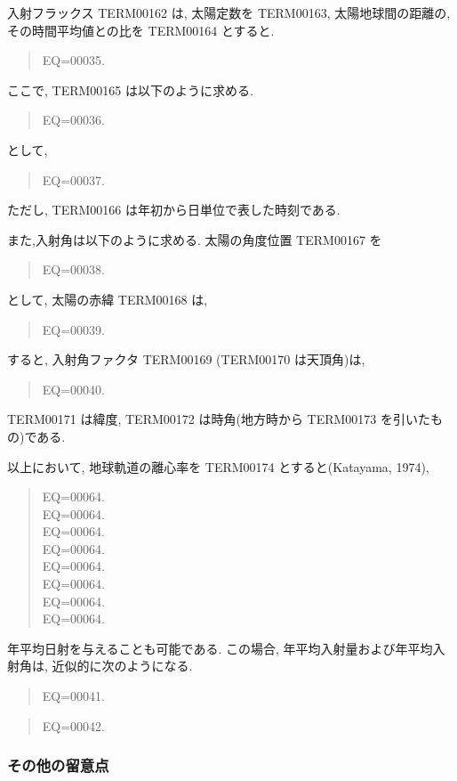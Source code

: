 入射フラックス TERM00162 は,
太陽定数を TERM00163, 
太陽地球間の距離の, 
その時間平均値との比を TERM00164 とすると.
%
\begin{quote}
EQ=00035.
\end{quote}
ここで, TERM00165 は以下のように求める.
%
\begin{quote}
EQ=00036.
\end{quote}
として,
\begin{quote}
EQ=00037.
\end{quote}
ただし, TERM00166 は年初から日単位で表した時刻である.

また,入射角は以下のように求める.
太陽の角度位置 TERM00167 を
\begin{quote}
EQ=00038.
\end{quote}
として,  太陽の赤緯 TERM00168 は,
\begin{quote}
EQ=00039.
\end{quote}
%
すると, 入射角ファクタ TERM00169 (TERM00170 は天頂角)は,
\begin{quote}
EQ=00040.
\end{quote}
TERM00171 は緯度,
TERM00172 は時角(地方時から TERM00173 を引いたもの)である.

以上において, 地球軌道の離心率を TERM00174 とすると(Katayama, 1974),
\begin{quote}
EQ=00064.\\
EQ=00064.\\
EQ=00064.\\
EQ=00064.\\
EQ=00064.\\
EQ=00064.\\
EQ=00064.\\
EQ=00064.
\end{quote}

年平均日射を与えることも可能である.
この場合, 年平均入射量および年平均入射角は, 
近似的に次のようになる.
%
\begin{quote}
EQ=00041.
\end{quote}
%
\begin{quote}
EQ=00042.
\end{quote}

\subsubsection{その他の留意点}

